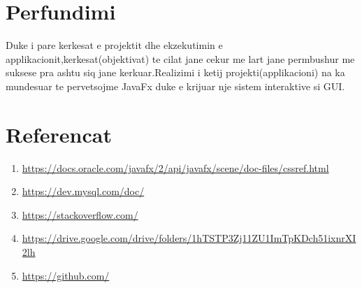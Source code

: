 \documentclass[a4paper]{article}
\begin{document}
\section{Perfundimi}
Duke i pare kerkesat e projektit dhe ekzekutimin e applikacionit,kerkesat(objektivat) te cilat jane cekur me lart jane permbushur me suksese pra ashtu siq jane kerkuar.Realizimi i ketij projekti(applikacioni) na ka mundesuar te pervetsojme JavaFx duke e krijuar nje sistem interaktive si GUI.\\
\vspace*{4cm}
\section{Referencat}

\begin{enumerate}
\item \url{https://docs.oracle.com/javafx/2/api/javafx/scene/doc-files/cssref.html}
\item \url{https://dev.mysql.com/doc/}
\item \url{https://stackoverflow.com/}
\item \url{https://drive.google.com/drive/folders/1hTSTP3Zj11ZU1ImTpKDch51ixnrXI2lh}
\item \url{https://github.com/}
\end{enumerate}
\end{document}
